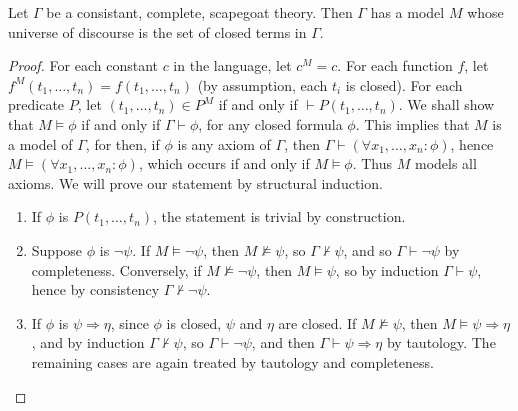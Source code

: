 \begin{lemma}
    Let $\Gamma$ be a consistant, complete, scapegoat theory. Then $\Gamma$ has a model $M$ whose universe of discourse is the set of closed terms in $\Gamma$.
\end{lemma}
\begin{proof}
    For each constant $c$ in the language, let $c^M = c$. For each function $f$, let $f^M(t_1, \dots, t_n) = f(t_1, \dots, t_n)$ (by assumption, each $t_i$ is closed). For each predicate $P$, let $(t_1, \dots, t_n) \in P^M$ if and only if $\vdash P(t_1, \dots, t_n)$. We shall show that $M \vDash \phi$ if and only if $\Gamma \vdash \phi$, for any closed formula $\phi$. This implies that $M$ is a model of $\Gamma$, for then, if $\phi$ is any axiom of $\Gamma$, then $\Gamma \vdash (\forall x_1, \dots, x_n: \phi)$, hence $M \vDash (\forall x_1, \dots, x_n: \phi)$, which occurs if and only if $M \vDash \phi$. Thus $M$ models all axioms. We will prove our statement by structural induction.
    \begin{enumerate}
        \item If $\phi$ is $P(t_1, \dots, t_n)$, the statement is trivial by construction.

        \item Suppose $\phi$ is $\neg \psi$. If $M \vDash \neg \psi$, then $M \not \vDash \psi$, so $\Gamma \not \vdash \psi$, and so $\Gamma \vdash \neg \psi$ by completeness. Conversely, if $M \not \vDash \neg \psi$, then $M \vDash \psi$, so by induction $\Gamma \vdash \psi$, hence by consistency $\Gamma \not \vdash \neg \psi$.

        \item If $\phi$ is $\psi \Rightarrow \eta$, since $\phi$ is closed, $\psi$ and $\eta$ are closed. If $M \not \vDash \psi$, then $M \vDash \psi \Rightarrow \eta$, and by induction $\Gamma \not \vdash \psi$, so $\Gamma \vdash \neg \psi$, and then $\Gamma \vdash \psi \Rightarrow \eta$ by tautology. The remaining cases are again treated by tautology and completeness.


\end{enumerate}
\end{proof}
